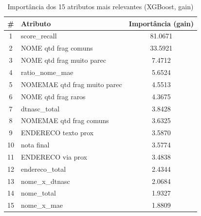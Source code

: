 \begin{table}[htbp]
\centering
\caption{Importância dos 15 atributos mais relevantes (XGBoost, gain)}
\label{tab:feature-importance-xgboost}
\begin{tabular}{clc}
\toprule
\textbf{\#} & \textbf{Atributo} & \textbf{Importância (gain)} \\
\midrule
  1 & score\_recall & 81.0671 \\
  2 & NOME qtd frag comuns & 33.5921 \\
  3 & NOME qtd frag muito parec & 7.4712 \\
  4 & ratio\_nome\_mae & 5.6524 \\
  5 & NOMEMAE qtd frag muito parec & 4.5513 \\
  6 & NOME qtd frag raros & 4.3675 \\
  7 & dtnasc\_total & 3.8428 \\
  8 & NOMEMAE qtd frag comuns & 3.6325 \\
  9 & ENDERECO texto prox & 3.5870 \\
  10 & nota final & 3.5774 \\
  11 & ENDERECO via prox & 3.4838 \\
  12 & endereco\_total & 2.4344 \\
  13 & nome\_x\_dtnasc & 2.0684 \\
  14 & nome\_total & 1.9327 \\
  15 & nome\_x\_mae & 1.8809 \\
\bottomrule
\end{tabular}
\end{table}